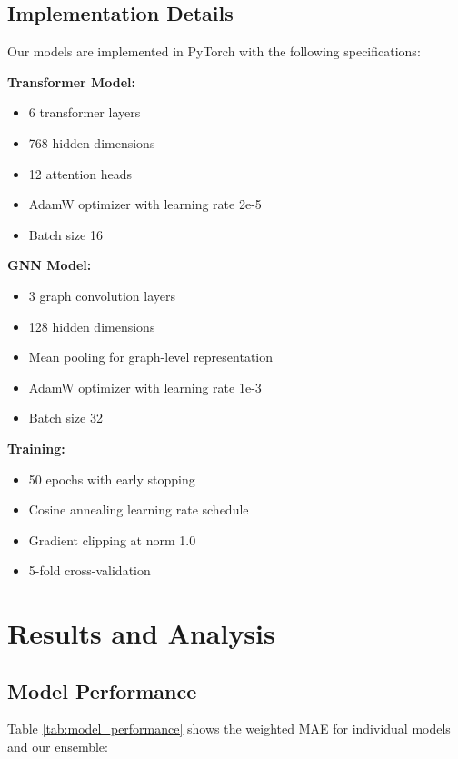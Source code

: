 \documentclass[10pt,twocolumn,letterpaper]{article}
\begin{document}
\subsection{Implementation Details}

Our models are implemented in PyTorch with the following specifications:

\textbf{Transformer Model:}
\begin{itemize}
    \item 6 transformer layers
    \item 768 hidden dimensions
    \item 12 attention heads
    \item AdamW optimizer with learning rate 2e-5
    \item Batch size 16
\end{itemize}

\textbf{GNN Model:}
\begin{itemize}
    \item 3 graph convolution layers
    \item 128 hidden dimensions
    \item Mean pooling for graph-level representation
    \item AdamW optimizer with learning rate 1e-3
    \item Batch size 32
\end{itemize}

\textbf{Training:}
\begin{itemize}
    \item 50 epochs with early stopping
    \item Cosine annealing learning rate schedule
    \item Gradient clipping at norm 1.0
    \item 5-fold cross-validation
\end{itemize}

\section{Results and Analysis}

\subsection{Model Performance}

Table \ref{tab:model_performance} shows the weighted MAE for individual models and our ensemble:
\end{document}
